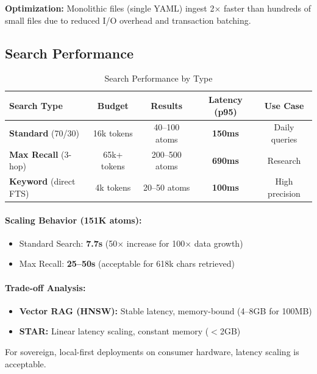 \documentclass[11pt]{article}
\begin{document}
\textbf{Optimization:} Monolithic files (single YAML) ingest 2$\times$ faster than hundreds of small files due to reduced I/O overhead and transaction batching.

\subsection{Search Performance}

\begin{table}[h]
\centering
\caption{Search Performance by Type}
\label{tab:search}
\begin{tabular}{@{}lcccc@{}}
\toprule
\textbf{Search Type} & \textbf{Budget} & \textbf{Results} & \textbf{Latency (p95)} & \textbf{Use Case} \\ \midrule
\textbf{Standard} (70/30) & 16k tokens & 40--100 atoms & \textbf{150ms} & Daily queries \\
\textbf{Max Recall} (3-hop) & 65k+ tokens & 200--500 atoms & \textbf{690ms} & Research \\
\textbf{Keyword} (direct FTS) & 4k tokens & 20--50 atoms & \textbf{100ms} & High precision \\ \bottomrule
\end{tabular}
\end{table}

\paragraph{Scaling Behavior (151K atoms):}
\begin{itemize}
    \item Standard Search: \textbf{7.7s} (50$\times$ increase for 100$\times$ data growth)
    \item Max Recall: \textbf{25--50s} (acceptable for 618k chars retrieved)
\end{itemize}

\paragraph{Trade-off Analysis:}
\begin{itemize}
    \item \textbf{Vector RAG (HNSW):} Stable latency, memory-bound (4--8GB for 100MB)
    \item \textbf{STAR:} Linear latency scaling, constant memory ($<$2GB)
\end{itemize}

For sovereign, local-first deployments on consumer hardware, latency scaling is acceptable.
\end{document}
